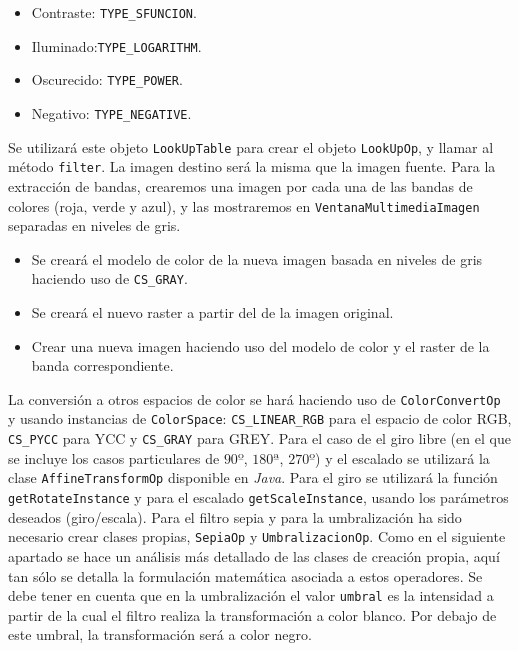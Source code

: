 \begin{itemize}
\item{Contraste: \texttt{TYPE\_SFUNCION}.}
\item{Iluminado:\texttt{TYPE\_LOGARITHM}.}
\item{Oscurecido: \texttt{TYPE\_POWER}.}
\item{Negativo: \texttt{TYPE\_NEGATIVE}.}
\end{itemize}
Se utilizará este objeto \texttt{LookUpTable} para crear el objeto \texttt{LookUpOp}, y llamar al método \texttt{filter}. La imagen destino será la misma que la imagen fuente.  
\vskip0.3cm
Para la extracción de bandas, crearemos una imagen por cada una de las bandas de colores (roja, verde y azul), y las mostraremos en \texttt{VentanaMultimediaImagen} separadas en niveles de gris.
\begin{itemize}
\item{Se creará el modelo de color de la nueva imagen basada en niveles de gris haciendo uso de \texttt{CS\_GRAY}.}
\item{Se creará el nuevo raster a partir del de la imagen original.}
\item{Crear una nueva imagen haciendo uso del modelo de color y el raster de la banda correspondiente.}
\end{itemize}
\vskip0.3cm
La conversión a otros espacios de color se hará haciendo uso de \texttt{ColorConvertOp} y usando instancias de \texttt{ColorSpace}: \texttt{CS\_LINEAR\_RGB} para el espacio de color RGB, \texttt{CS\_PYCC} para YCC y \texttt{CS\_GRAY} para GREY.
\vskip0.3cm
Para el caso de el giro libre (en el que se incluye los casos particulares de $90º$, $180ª$, $270º$) y el escalado se utilizará la clase \texttt{AffineTransformOp} disponible en \textit{Java}. Para el giro se utilizará la función \texttt{getRotateInstance} y para el escalado \texttt{getScaleInstance}, usando los parámetros deseados (giro/escala).
\vskip0.3cm
Para el filtro sepia y para la umbralización ha sido necesario crear clases propias, \texttt{SepiaOp} y \texttt{UmbralizacionOp}. Como en el siguiente apartado se hace un análisis más detallado de las clases de creación propia, aquí tan sólo se detalla la formulación matemática asociada a estos operadores.\vskip0.3cm
Se debe tener en cuenta que en la umbralización el valor \texttt{umbral} es la intensidad a partir de la cual el filtro realiza la transformación a color blanco. Por debajo de este umbral, la transformación será a color negro. 
